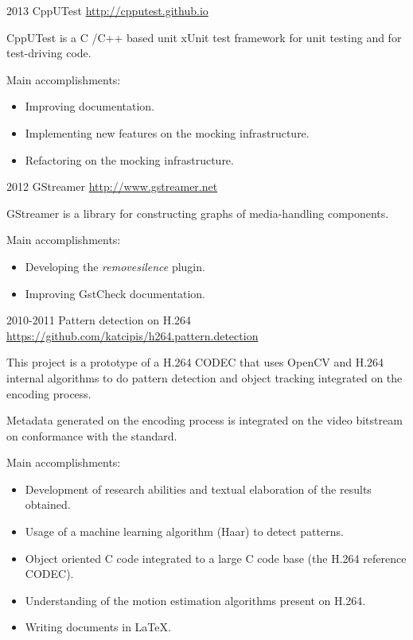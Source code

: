 \documentclass[]{friggeri-cv} %
\begin{document}
\begin{entrylist}
\entry
{2013}
{CppUTest}
{\href{http://cpputest.github.io}{http://cpputest.github.io}}
{
CppUTest is a C /C++ based unit xUnit test framework for unit testing and for test-driving code.

Main accomplishments:\\
\begin{itemize}
\item Improving documentation.
\item Implementing new features on the mocking infrastructure.
\item Refactoring on the mocking infrastructure.
\end{itemize}
}
\end{entrylist}

\begin{entrylist}
\entry
{2012}
{GStreamer}
{\href{http://www.gstreamer.net}{http://www.gstreamer.net}}
{
GStreamer is a library for constructing graphs of media-handling components.

Main accomplishments:\\
\begin{itemize}
\item Developing the \emph{removesilence} plugin.
\item Improving GstCheck documentation.
\end{itemize}
}
\end{entrylist}

\begin{entrylist}
\entry
{2010-2011}
{Pattern detection on H.264}
{\href{https://github.com/katcipis/h264.pattern.detection}{https://github.com/katcipis/h264.pattern.detection}}
{
This project is a prototype of a H.264 CODEC that uses OpenCV and H.264 internal algorithms to do pattern detection and
object tracking integrated on the encoding process.

Metadata generated on the encoding process is integrated on the video bitstream on conformance with the standard.

Main accomplishments:\\
\begin{itemize}
\item Development of research abilities and textual elaboration of the results obtained.
\item Usage of a machine learning algorithm (Haar) to detect patterns.
\item Object oriented C code integrated to a large C code base (the H.264 reference CODEC).
\item Understanding of the motion estimation algorithms present on H.264.
\item Writing documents in LaTeX.
\end{itemize}
}
\end{entrylist}
\end{document}

